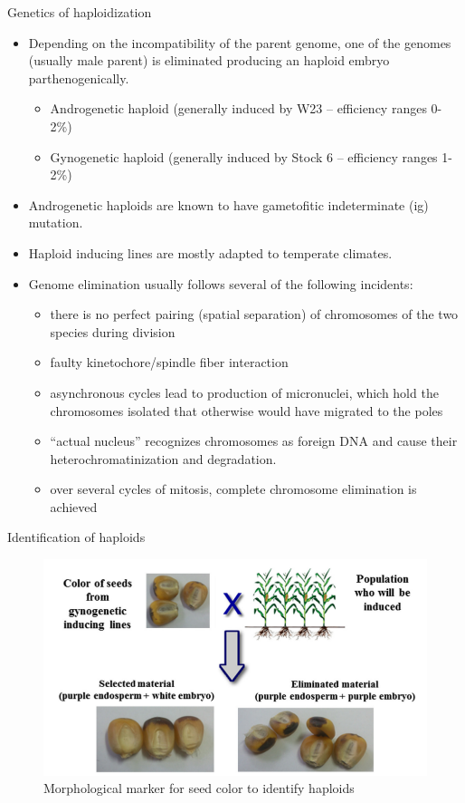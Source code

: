 \documentclass[
  ignorenonframetext,
  aspectratio=169]{beamer}
\providecommand{\tightlist}{%
  \setlength{\itemsep}{0pt}\setlength{\parskip}{0pt}}
\begin{document}
\begin{frame}{Genetics of haploidization}
\protect\hypertarget{genetics-of-haploidization}{}
\begin{itemize}
\tightlist
\item
  Depending on the incompatibility of the parent genome, one of the
  genomes (usually male parent) is eliminated producing an haploid
  embryo parthenogenically.

  \begin{itemize}
  \tightlist
  \item
    Androgenetic haploid (generally induced by W23 -- efficiency ranges
    0-2\%)
  \item
    Gynogenetic haploid (generally induced by Stock 6 -- efficiency
    ranges 1-2\%)
  \end{itemize}
\item
  Androgenetic haploids are known to have gametofitic indeterminate (ig)
  mutation.
\item
  Haploid inducing lines are mostly adapted to temperate climates.
\item
  Genome elimination usually follows several of the following incidents:

  \begin{itemize}
  \tightlist
  \item
    there is no perfect pairing (spatial separation) of chromosomes of
    the two species during division
  \item
    faulty kinetochore/spindle fiber interaction
  \item
    asynchronous cycles lead to production of micronuclei, which hold
    the chromosomes isolated that otherwise would have migrated to the
    poles
  \item
    ``actual nucleus'' recognizes chromosomes as foreign DNA and cause
    their heterochromatinization and degradation.
  \item
    over several cycles of mitosis, complete chromosome elimination is
    achieved
  \end{itemize}
\end{itemize}
\end{frame}

\begin{frame}{Identification of haploids}
\protect\hypertarget{identification-of-haploids}{}
\begin{figure}
\includegraphics[width=0.7\linewidth]{../images/gynogenetic-haploid-identification} \caption{Morphological marker for seed color to identify haploids}\label{fig:gynogenetic-haploid-identification}
\end{figure}
\end{frame}
\end{document}
